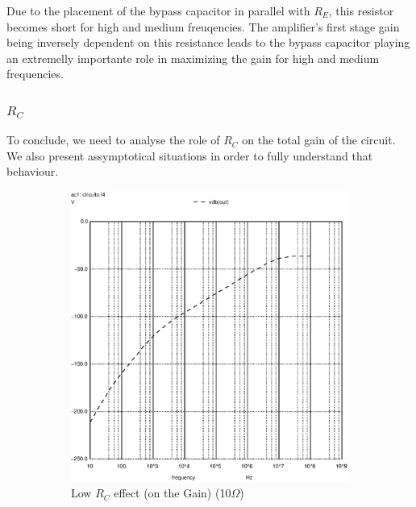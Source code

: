 Due to the placement of the bypass capacitor in parallel with $R_E$, this resistor becomes short for high and medium freuqencies. The amplifier's first stage gain being inversely dependent on this resistance leads to the bypass capacitor playing an extremelly importante role in maximizing the gain for high and medium frequencies.

\subsubsection{$R_C$}

To conclude, we need to analyse the role of $R_C$ on the total gain of the circuit.
We also present assymptotical situations in order to fully understand that behaviour.

\begin{figure}[h]
\centering
\begin{subfigure}{.5\textwidth}
    \centering
    \includegraphics[scale=0.33]{images/rclow_10.eps}
    \caption{Low $R_C$ effect (on the Gain) (10$\Omega$)}
\end{subfigure}%
\begin{subfigure}{.5\textwidth}
    \centering

\end{subfigure}
\end{figure}
